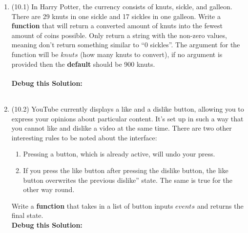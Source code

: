 \documentclass{article}
\newcommand{\csq}[1]{\reflectbox{''}#1''}  %
\begin{document}
\begin{enumerate}
\item (10.1) 
		In Harry Potter, the currency consists of knuts, sickle, and galleon. There are 29 knuts in 
		one sickle and 17 sickles in one galleon. Write a \textbf{function} that will return a 
		converted amount of knuts into the fewest amount of coins possible. Only return a string 
		with the non-zero values, meaning don't return something similar to ``0 sickles''. The 
		argument for the function will be $knuts$ (how many knuts to convert), if no argument is 
		provided then the \textbf{default} should be 900 knuts. \\ \\
		\textbf{Debug this Solution:}\\
		\mbox{ \hspace*{0.25in}	}

\pagebreak



\item (10.2)
		YouTube currently displays a like and a dislike button, allowing you to express your opinions 
		about particular content. 
		It's set up in such a way that you cannot like and dislike a video at the same time.
		There are two other interesting rules to be noted about the interface:
		\begin{enumerate}
			\item Pressing a button, which is already active, will undo your press.
			\item If you press the like button after pressing the dislike button, the like button overwrites 
				the previous \csq{dislike} state. The same is true for the other way round.
		\end{enumerate}
		Write a \textbf{function} that takes in a list of button inputs $events$ and returns the final state.\\

		\textbf{Debug this Solution:}\\
		\mbox{ \hspace*{0.25in}	}

\pagebreak



\end{enumerate}
\end{document}
